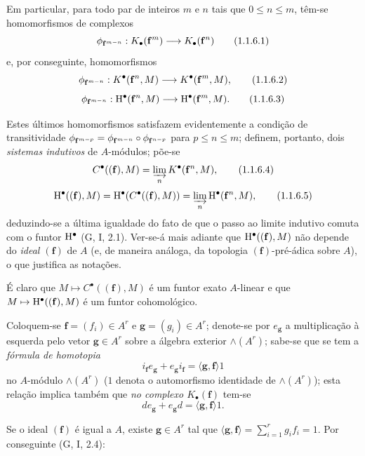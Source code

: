 \begin{env}[1.1.6]
\label{III.1.1.6}
Em particular, para todo par de inteiros $m$ e $n$ tais que $0\leq n\leq m$, têm-se homomorfismos de complexos
\[
  \vphi_{\mathbf{f}^{m-n}}:K_\bullet(\mathbf{f}^m)\to K_\bullet(\mathbf{f}^n)
  \tag{1.1.6.1}
\]
e, por conseguinte, homomorfismos
\[
  \vphi_{\mathbf{f}^{m-n}}:K^\bullet(\mathbf{f}^n,M)\to K^\bullet(\mathbf{f}^m,M),
  \tag{1.1.6.2}
\]
\[
  \vphi_{\mathbf{f}^{m-n}}:\HH^\bullet(\mathbf{f}^n,M)\to\HH^\bullet(\mathbf{f}^m,M).
  \tag{1.1.6.3}
\]

Estes últimos homomorfismos satisfazem evidentemente a condição de transitividade $\phi_{\mathbf{f}^{m-p}}=\phi_{\mathbf{f}^{m-n}}\circ\phi_{\mathbf{f}^{n-p}}$ para $p\leq n\leq m$; definem, portanto, dois \emph{sistemas indutivos} de $A$-módulos; põe-se
\[
  C^\bullet((\mathbf{f}),M)=\varinjlim_n K^\bullet(\mathbf{f}^n,M),
  \tag{1.1.6.4}
\]
\[
  \mathrm{H}^\bullet((\mathbf{f}),M)=\mathrm{H}^\bullet(C^\bullet((\mathbf{f}),M))=\varinjlim_n\mathrm{H}^\bullet(\mathbf{f}^n,M),
  \tag{1.1.6.5}
\]
deduzindo-se a última igualdade do fato de que o passo ao limite indutivo comuta com o funtor $\mathrm{H}^\bullet$ (G, I, 2.1).
Ver-se-á mais adiante  que $\mathrm{H}^\bullet((\mathbf{f}),M)$ não depende do \emph{ideal $(\mathbf{f})$} de $A$ (e, de maneira análoga, da topologia $(\mathbf{f})$-pré-ádica sobre $A$), o que justifica as notações.

É claro que $M\mapsto C^\bullet((\mathbf{f}),M)$ é um funtor exato $A$-linear e que $M\mapsto\HH^\bullet((\mathbf{f}),M)$ é um funtor cohomológico.
\end{env}

\begin{env}[1.1.7]
\label{III.1.1.7}
Coloquem-se $\mathbf{f}=(f_i)\in A^r$ e $\mathbf{g}=(g_i)\in A^r$; denote-se por $e_\mathbf{g}$ a multiplicação à esquerda pelo vetor $\mathbf{g}\in A^r$ sobre a álgebra exterior $\wedge(A^r)$; sabe-se que se tem a \emph{fórmula de homotopia}
\[
  i_\mathbf{f}e_\mathbf{g}+e_\mathbf{g}i_\mathbf{f}=\langle\mathbf{g},\mathbf{f}\rangle 1
  \tag{1.1.7.1}
\]
no $A$-módulo $\wedge(A^r)$ ($1$ denota o automorfismo identidade de $\wedge(A^r)$); esta relação implica também que \emph{no complexo $K_\bullet(\mathbf{f})$} tem-se
\[
  de_\mathbf{g}+e_\mathbf{g}d=\langle\mathbf{g},\mathbf{f}\rangle 1.
  \tag{1.1.7.2}
\]

Se o ideal $(\mathbf{f})$ é igual a $A$, existe $\mathbf{g}\in A^r$ tal que $\langle\mathbf{g},\mathbf{f}\rangle=\sum_{i=1}^r g_i f_i=1$.
Por conseguinte (G, I, 2.4):
\end{env}


